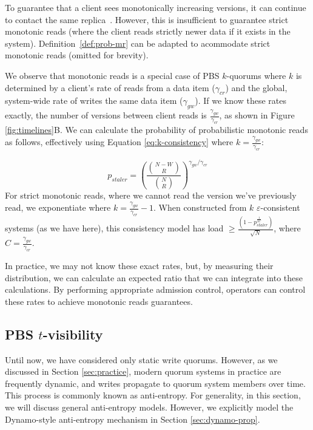 \documentclass{vldb}
\begin{document}
To guarantee that a client sees monotonically increasing versions, it
can continue to contact the same replica~\cite{vogels-defs}.  However,
this is insufficient to guarantee strict monotonic reads (where the
client reads strictly newer data if it exists in the system).
Definition~\ref{def:prob-mr} can be adapted to acommodate strict
monotonic reads (omitted for brevity).

We observe that monotonic reads is a special case of PBS
$k$-quorums where $k$ is determined by a client's rate of reads from a
data item ($\gamma_{cr}$) and the global, system-wide rate of writes
the same data item ($\gamma_{gw}$).  If we know these rates
exactly, the number of versions between client reads is
$\frac{\gamma_{gw}}{\gamma_{cr}}$, as shown in Figure
\ref{fig:timelines}B.  We can calculate the probability of
probabilistic monotonic reads as follows, effectively using Equation
\ref{eq:k-consistency} where $k=\frac{\gamma_{gw}}{\gamma_{cr}}$:

\begin{equation}
\label{eq:prob-mr}
p_{staler} = \left(\frac{{N-W \choose R}}{{N \choose R}}\right)^{\gamma_{gw}/\gamma_{cr}}
\end{equation}
For strict monotonic reads, where we cannot read the version we've
previously read, we exponentiate where
$k=\frac{\gamma_{gw}}{\gamma_{cr}}-1$.  When constructed from $k$
$\varepsilon$-consistent systems (as we have here), this consistency
model has load $\geq \frac{(1-p_{staler}^{\frac{1}{2C}})}{\sqrt{N}}$,
where $C=\frac{\gamma_{gw}}{\gamma_{cr}}$.

In practice, we may not know these exact rates, but, by measuring
their distribution, we can calculate an expected ratio that we can
integrate into these calculations.  By performing appropriate
admission control, operators can control these rates to achieve
monotonic reads guarantees.

\subsection{PBS $t$-visibility}
\label{sec:tvis}


Until now, we have considered only static write quorums.  However, as
we discussed in Section \ref{sec:practice}, modern quorum systems in
practice are frequently dynamic, and writes propagate to quorum system
members over time.  This process is commonly known as anti-entropy.
For generality, in this section, we will discuss general anti-entropy
models. However, we explicitly model the Dynamo-style anti-entropy
mechanism in Section \ref{sec:dynamo-prop}.
\end{document}
